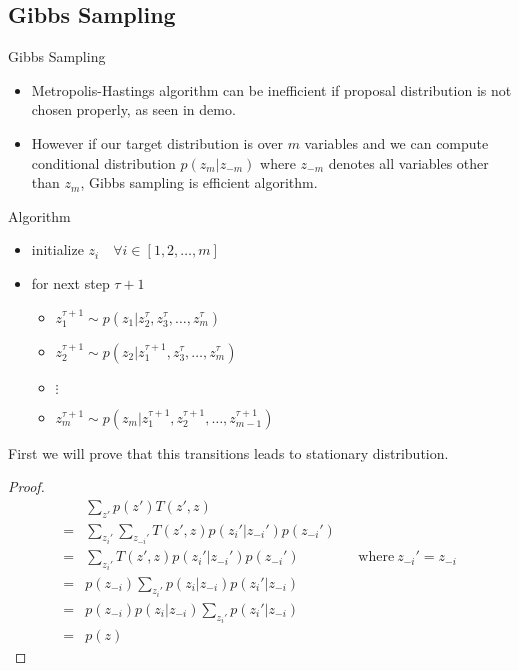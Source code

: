 \documentclass[pdf]{beamer}
\begin{document}
\subsection{Gibbs Sampling}
\begin{frame}{Gibbs Sampling}
  \begin{itemize}
  \item   Metropolis-Hastings algorithm can be inefficient if proposal distribution is not chosen properly, as seen in demo.

    \pause
  \item   However if our target distribution is over $m$ variables and we can compute conditional distribution $p(z_m|z_{-m})$ where $z_{-m}$ denotes all variables other than $z_m$, Gibbs sampling is efficient algorithm.
  \end{itemize}



  \pause

  \begin{block}{Algorithm}
    \begin{itemize}
    \item initialize $z_i \quad \forall i \in [1,2, \dots , m]$
    \item for next step $\tau + 1$
      \begin{itemize}
      \item $z_1^{\tau+1} \sim p(z_1 | z_2^\tau, z_3^\tau, \dots, z_m^\tau)$
      \item $z_2^{\tau+1} \sim p(z_2 | z_1^{\tau+1}, z_3^\tau, \dots, z_m^\tau)$

      \item[]{$\vdots$}

      \item $z_m^{\tau+1} \sim p(z_m | z_1^{\tau+1}, z_2^{\tau+1}, \dots, z_{m-1}^{\tau+1})$
      \end{itemize}
    \end{itemize}
  \end{block}
\end{frame}

\begin{frame}[shrink]
  First we will prove that this transitions leads to stationary distribution.

  \begin{proof}
    \begin{align*}
      &  \sum_{z'}p(z') T(z', z) \\
      =& \sum_{z_i'}  \sum_{z_{-i}'} T(z', z) p(z_i'|z_{-i}') p(z_{-i}')  \\
      =& \sum_{z_i'}  T(z', z) p(z_i'|z_{-i}') p(z_{-i}') &&\text{where} \  z_{-i}' = z_{-i} \\
      =&  p(z_{-i}) \sum_{z_i'}  p(z_i|z_{-i}) p(z_i'|z_{-i}) \\
      =&  p(z_{-i})  p(z_i|z_{-i}) \sum_{z_i'}  p(z_i'|z_{-i}) \\
      =& p(z)
    \end{align*}
  \end{proof}
\end{frame}
\end{document}
